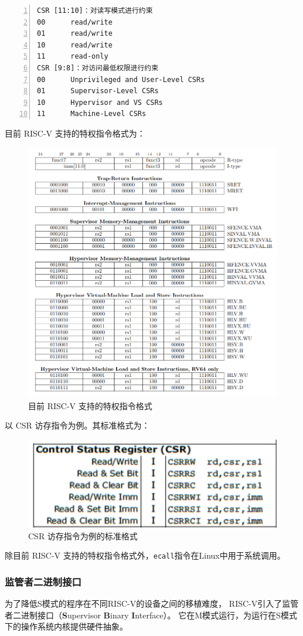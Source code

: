 \documentclass[UTF8,fontset=none,linespread=1.15]{ctexart}
\begin{document}
\begin{lstlisting}[numbers=left]
CSR [11:10]：对读写模式进行约束
00		read/write
01		read/write
10		read/write
11		read-only
CSR [9:8]：对访问最低权限进行约束
00		Unprivileged and User-Level CSRs
01		Supervisor-Level CSRs
10		Hypervisor and VS CSRs
11		Machine-Level CSRs
\end{lstlisting}


目前 RISC-V 支持的特权指令格式为：
\begin{figure}[H]
	\centering
	\includegraphics[width=0.7\linewidth]{assets/W2}
	\caption{目前 RISC-V 支持的特权指令格式}
	\label{fig:w2}
\end{figure}
以 CSR 访存指令为例。其标准格式为：
\begin{figure}[H]
	\centering
	\includegraphics[width=0.7\linewidth]{assets/W3}
	\caption{ CSR 访存指令为例的标准格式}
	\label{fig:w3}
\end{figure}
除目前 RISC-V 支持的特权指令格式外，\texttt{ecall}指令在Linux中用于系统调用。

\subsubsection{监管者二进制接口}
为了降低S模式的程序在不同RISC-V的设备之间的移植难度，
RISC-V引入了监管者二进制接口（\textbf{S}upervisor \textbf{B}inary \textbf{I}nterface）。
它在M模式运行，为运行在S模式下的操作系统内核提供硬件抽象。
\end{document}

